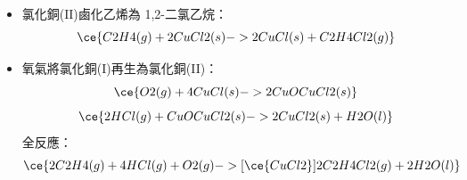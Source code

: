 \documentclass[a4paper,12pt]{report}
\begin{document}
\begin{itemize}
\subsubsection{鹼催化與無催化水解反應}
生成物為酸鹽與胺，在鹼中不可逆。鹼只能催化醯胺的水解反應而不能催化醯胺化反應。
\[\text{醯胺 + \ce{OH- ->} 酸鹽 + 胺}\]
如：
\[\text{N-甲基乙醯胺} + \ce{OH- -> CH3COO- + CH3NH2}\]


\section{加成反應}
\subsection{催化氫化反應}
鎳、鈀或鉑等催化，烯、炔、芳香烴等不飽和有機化合物可以斷 π 鍵氫化。烯、炔、芳香烴的完全氫化的產物為烷類，如苯加三分子氫變成環己烷；不飽和脂肪酸完全氫化的產物為飽和脂肪酸，如液態玉米油等經氫化產生固態的人造奶油。
\subsection{親電加成反應}
芳香烴因為其離域 π 鍵而不會進行親電加成。
\subsubsection{鹵化反應}
烯類加鹵素的產物為二鹵烷類；一炔類加一鹵素的產物為二鹵烯類（通常反式/E 異構物較多）；炔類完全鹵化的產物為四鹵烷類；苯經紫外光照射三分子氯氣反應產生 1,2,3,4,5,6-六氯環己烷（無法經氯化鐵(III)、氯化鋁、鐵粉等催化而得）；的溶液（通常用四氯甲烷為溶劑）呈紅棕色，溴烴則無色，故常以此褪色反應測定非離域 π 鍵數。
\subsubsection{氫鹵化反應}
炔的氫鹵化反應以硫酸汞與硫酸的稀酸水溶液為催化劑。
\begin{itemize}
\item 一分子烯與一分子鹵化氫反應得鹵烷，如乙烯+氯化氫 $\rightarrow$ 氯乙烷。
\item 一分子炔與一分子鹵化氫反應得鹵烯，如乙炔+氯化氫 $\rightarrow$ 氯乙烯、1-丁烯-3-炔（乙烯基乙炔） +氯化氫 $\rightarrow$ 2-氯-1,3-丁二烯。
\item 一分子炔與二分子鹵化氫完全反應得二鹵烷，如乙炔+2氯化氫 $\rightarrow$ 二氯乙烷。
\end{itemize}
工業上以乙烯與氯化氫經氯化銅(II)催化製備 1,2-二氯乙烷的反應，由於氯化氫較氯氣便宜故是 1,2-二氯乙烷的主要生產方式，1,2-二氯乙烷則可進一步用於裂解成氯乙烯。
\ben
\item 氯化銅(ΙΙ)鹵化乙烯為 1,2-二氯乙烷：
\[\ce{C2H4(g) + 2CuCl2(s) -> 2CuCl(s) + C2H4Cl2(g)}\]
\item 氧氣將氯化銅(I)再生為氯化銅(II)：
\[\ce{O2(g) + 4CuCl(s) -> 2CuOCuCl2(s)}\]
\[\ce{2HCl(g) + CuOCuCl2(s) -> 2CuCl2(s) + H2O(l)}\]
\een
全反應：
\[\ce{2C2H4(g) + 4HCl(g) + O2(g) ->[\ce{CuCl2}] 2C2H4Cl2(g) + 2H2O(l)}\]

\end{itemize}
\end{document}
